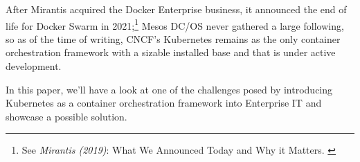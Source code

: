 After Mirantis acquired the Docker Enterprise business, it announced the end of life for Docker Swarm in 2021;\footnote{See \textit{Mirantis (2019)}: What We Announced Today and Why it Matters. \cite{mirantisDocker}} Mesos DC/OS never gathered a large following, so as of the time of writing, CNCF's Kubernetes remains as the only container orchestration framework with a sizable installed base and that is under active development.

In this paper, we'll have a look at one of the challenges posed by introducing Kubernetes as a container orchestration framework into Enterprise IT and showcase a possible solution.
